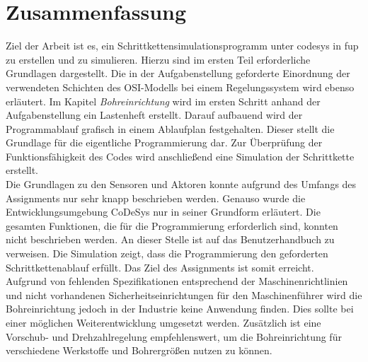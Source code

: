 \section{Zusammenfassung}
Ziel der Arbeit ist es, ein Schrittkettensimulationsprogramm unter \ac{codesys} in \ac{fup} zu erstellen und zu simulieren. Hierzu sind im ersten Teil erforderliche Grundlagen dargestellt. Die in der Aufgabenstellung geforderte Einordnung der verwendeten Schichten des OSI-Modells bei einem Regelungssystem wird ebenso erläutert. Im Kapitel \textit{Bohreinrichtung} wird im ersten Schritt anhand der Aufgabenstellung ein Lastenheft erstellt. Darauf aufbauend wird der Programmablauf grafisch in einem Ablaufplan festgehalten. Dieser stellt die Grundlage für die eigentliche Programmierung dar. Zur Überprüfung der Funktionsfähigkeit des Codes wird anschließend eine Simulation der Schrittkette erstellt.\\
Die Grundlagen zu den Sensoren und Aktoren konnte aufgrund des Umfangs des Assignments nur sehr knapp beschrieben werden. Genauso wurde die Entwicklungsumgebung CoDeSys nur in seiner Grundform erläutert. Die gesamten Funktionen, die für die Programmierung erforderlich sind, konnten nicht beschrieben werden. An dieser Stelle ist auf das Benutzerhandbuch \autocite[][]{manCODESYS} zu verweisen. Die Simulation zeigt, dass die Programmierung den geforderten Schrittkettenablauf erfüllt. Das Ziel des Assign\-ments ist somit erreicht.\\
Aufgrund von fehlenden Spezifikationen entsprechend der Maschinenrichtlinien und nicht vorhandenen Sicherheitseinrichtungen für den Maschinenführer wird die Bohreinrichtung jedoch in der Industrie keine Anwendung finden. Dies sollte bei einer möglichen Weiterentwicklung umgesetzt werden. Zusätzlich ist eine Vorschub- und Drehzahlregelung empfehlenswert, um die Bohreinrichtung für verschiedene Werkstoffe und Bohrergrößen nutzen zu können.